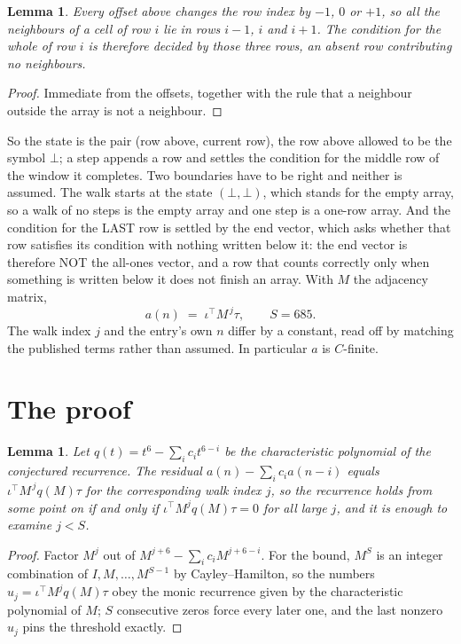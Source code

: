 \documentclass[11pt,a4paper]{article}
\theoremstyle{plain}
\newtheorem{lemma}[theorem]{Lemma}
\theoremstyle{definition}
\begin{document}
\begin{lemma}\label{lem:win}
Every offset above changes the row index by $-1$, $0$ or $+1$, so all the neighbours of a cell
of row $i$ lie in rows $i-1$, $i$ and $i+1$. The condition for the whole of row $i$ is
therefore decided by those three rows, an absent row contributing no neighbours.
\end{lemma}

\begin{proof}
Immediate from the offsets, together with the rule that a neighbour outside the array is not a
neighbour.
\end{proof}

So the state is the pair (row above, current row), the row above allowed to be the symbol
$\bot$; a step appends a row and settles the condition for the middle row of the window it
completes. Two boundaries have to be right and neither is assumed. The walk starts at the state
$(\bot,\bot)$, which stands for the empty array, so a walk of no steps is the empty array and
one step is a one-row array. And the condition for the LAST row is settled by the end vector,
which asks whether that row satisfies its condition with nothing written below it: the end
vector is therefore NOT the all-ones vector, and a row that counts correctly only when
something is written below it does not finish an array. With $M$ the adjacency matrix,
\[
a(n)\;=\;\iota^{\!\top}M^{\,j}\tau ,\qquad S=685.
\]
The walk index $j$ and the entry's own $n$ differ by a constant, read off by matching the
published terms rather than assumed. In particular $a$ is $C$-finite.

\section{The proof}

\begin{lemma}\label{lem:crit}
Let $q(t)=t^{6}-\sum_i c_it^{6-i}$ be the characteristic polynomial of the
conjectured recurrence. The residual $a(n)-\sum_ic_ia(n-i)$ equals
$\iota^{\!\top}M^{\,j}q(M)\tau$ for the corresponding walk index $j$, so the recurrence
holds from some point on if and only if $\iota^{\!\top}M^{j}q(M)\tau=0$ for all large $j$,
and it is enough to examine $j<S$.
\end{lemma}

\begin{proof}
Factor $M^{j}$ out of $M^{j+6}-\sum_ic_iM^{j+6-i}$. For the bound, $M^{S}$
is an integer combination of $I,M,\dots,M^{S-1}$ by Cayley--Hamilton, so the numbers
$u_j=\iota^{\!\top}M^{j}q(M)\tau$ obey the monic recurrence given by the characteristic
polynomial of $M$; $S$ consecutive zeros force every later one, and the last nonzero $u_j$
pins the threshold exactly.
\end{proof}
\end{document}
